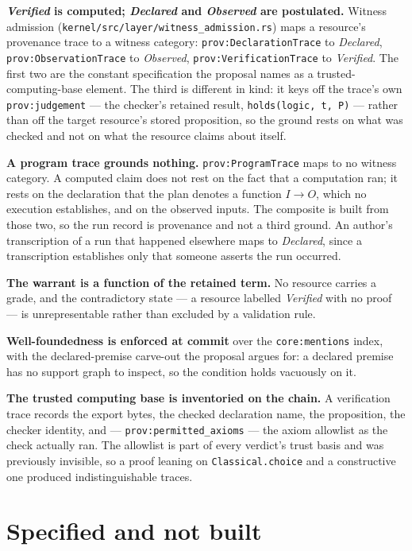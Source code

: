 \documentclass[manuscript,nonacm=true]{acmart}
\newcommand{\code}[1]{\texttt{\small #1}}
\newcommand{\cl}[1]{\textbf{#1}}
\begin{document}
\cl{\emph{Verified} is computed; \emph{Declared} and \emph{Observed} are postulated.} Witness admission (\code{kernel/src/layer/witness\_admission.rs}) maps a resource's provenance trace to a witness category: \code{prov:DeclarationTrace} to \emph{Declared}, \code{prov:ObservationTrace} to \emph{Observed}, \code{prov:VerificationTrace} to \emph{Verified}. The first two are the constant specification the proposal names as a trusted-computing-base element. The third is different in kind: it keys off the trace's own \code{prov:judgement} --- the checker's retained result, \code{holds(logic, t, P)} --- rather than off the target resource's stored proposition, so the ground rests on what was checked and not on what the resource claims about itself.

\cl{A program trace grounds nothing.} \code{prov:ProgramTrace} maps to no witness category. A computed claim does not rest on the fact that a computation ran; it rests on the declaration that the plan denotes a function $I \to O$, which no execution establishes, and on the observed inputs. The composite is built from those two, so the run record is provenance and not a third ground. An author's transcription of a run that happened elsewhere maps to \emph{Declared}, since a transcription establishes only that someone asserts the run occurred.

\cl{The warrant is a function of the retained term.} No resource carries a grade, and the contradictory state --- a resource labelled \emph{Verified} with no proof --- is unrepresentable rather than excluded by a validation rule.

\cl{Well-foundedness is enforced at commit} over the \code{core:mentions} index, with the declared-premise carve-out the proposal argues for: a declared premise has no support graph to inspect, so the condition holds vacuously on it.

\cl{The trusted computing base is inventoried on the chain.} A verification trace records the export bytes, the checked declaration name, the proposition, the checker identity, and --- \code{prov:permitted\_axioms} --- the axiom allowlist as the check actually ran. The allowlist is part of every verdict's trust basis and was previously invisible, so a proof leaning on \code{Classical.choice} and a constructive one produced indistinguishable traces.

\section{Specified and not built}
\end{document}
